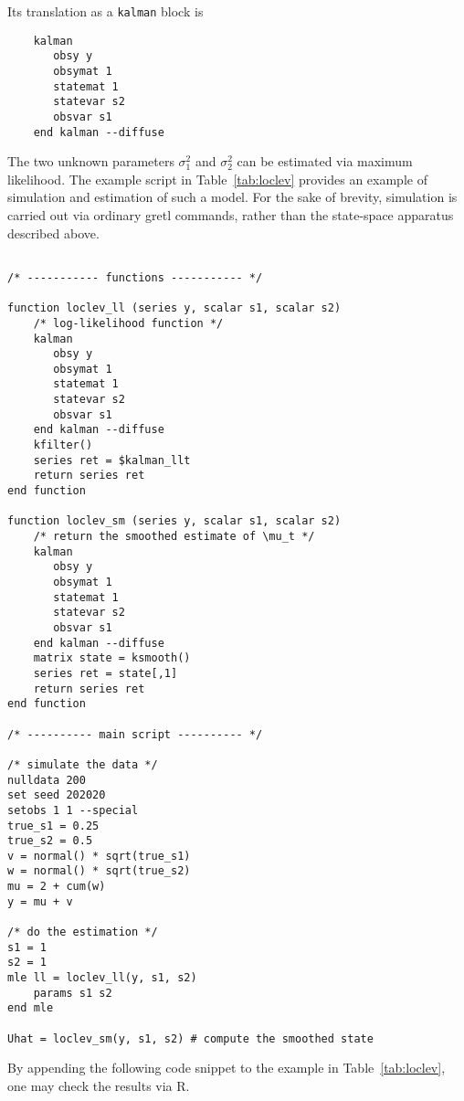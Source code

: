 \documentclass[a4paper]{article}
\begin{document}
Its translation as a \texttt{kalman} block is
\begin{verbatim}
    kalman
       obsy y
       obsymat 1
       statemat 1
       statevar s2
       obsvar s1
    end kalman --diffuse
\end{verbatim}

The two unknown parameters $\sigma^2_1$ and $\sigma^2_2$ can be
estimated via maximum likelihood.  The example script in
Table~\ref{tab:loclev} provides an example of simulation and
estimation of such a model. For the sake of brevity, simulation is
carried out via ordinary gretl commands, rather than the state-space
apparatus described above.

\begin{table}[htbp]
  \caption{Local level model}
  \label{tab:loclev}

\begin{small}
\begin{verbatim}

/* ----------- functions ----------- */

function loclev_ll (series y, scalar s1, scalar s2)
    /* log-likelihood function */
    kalman
       obsy y
       obsymat 1
       statemat 1
       statevar s2
       obsvar s1
    end kalman --diffuse
    kfilter()
    series ret = $kalman_llt
    return series ret
end function

function loclev_sm (series y, scalar s1, scalar s2)
    /* return the smoothed estimate of \mu_t */
    kalman
       obsy y
       obsymat 1
       statemat 1
       statevar s2
       obsvar s1
    end kalman --diffuse
    matrix state = ksmooth()
    series ret = state[,1]
    return series ret
end function

/* ---------- main script ---------- */

/* simulate the data */
nulldata 200
set seed 202020
setobs 1 1 --special
true_s1 = 0.25
true_s2 = 0.5
v = normal() * sqrt(true_s1)
w = normal() * sqrt(true_s2)
mu = 2 + cum(w)
y = mu + v

/* do the estimation */
s1 = 1
s2 = 1
mle ll = loclev_ll(y, s1, s2)
    params s1 s2
end mle

Uhat = loclev_sm(y, s1, s2) # compute the smoothed state
\end{verbatim}
\end{small}
\end{table}

By appending the following code snippet to the example in
Table~\ref{tab:loclev}, one may check the results via \textsf{R}.
\end{document}
